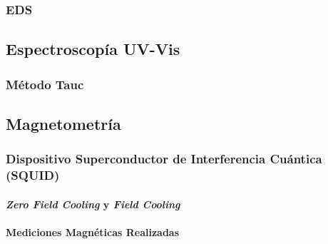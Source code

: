 \documentclass[../main.tex]{subfiles}
\begin{document}
\subsubsection{EDS}

\subsection{Espectroscopía UV-Vis}

\subsubsection{Método Tauc}

\subsection{Magnetometría}

\subsubsection{Dispositivo Superconductor de Interferencia Cuántica (SQUID)}

\paragraph{\textit{Zero Field Cooling} y \textit{Field Cooling}}

\paragraph{Mediciones Magnéticas Realizadas}
\end{document}
